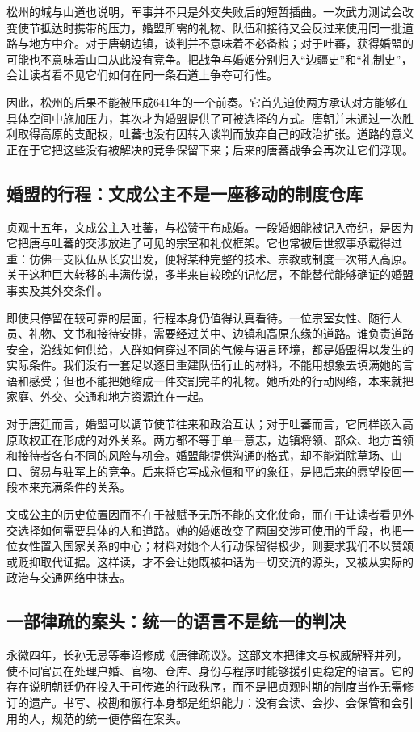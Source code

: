 松州的城与山道也说明，军事并不只是外交失败后的短暂插曲。一次武力测试会改变使节抵达时携带的压力，婚盟所需的礼物、队伍和接待又会反过来使用同一批道路与地方中介。对于唐朝边镇，谈判并不意味着不必备粮；对于吐蕃，获得婚盟的可能也不意味着山口从此没有竞争。把战争与婚姻分别归入“边疆史”和“礼制史”，会让读者看不见它们如何在同一条石道上争夺可行性。

因此，松州的后果不能被压成641年的一个前奏。它首先迫使两方承认对方能够在具体空间中施加压力，其次才为婚盟提供了可被选择的方式。唐朝并未通过一次胜利取得高原的支配权，吐蕃也没有因转入谈判而放弃自己的政治扩张。道路的意义正在于它把这些没有被解决的竞争保留下来；后来的唐蕃战争会再次让它们浮现。

\subsection{婚盟的行程：文成公主不是一座移动的制度仓库}
贞观十五年，文成公主入吐蕃，与松赞干布成婚。一段婚姻能被记入帝纪，是因为它把唐与吐蕃的交涉放进了可见的宗室和礼仪框架。它也常被后世叙事承载得过重：仿佛一支队伍从长安出发，便将某种完整的技术、宗教或制度一次带入高原。关于这种巨大转移的丰满传说，多半来自较晚的记忆层，不能替代能够确证的婚盟事实及其外交条件。

即使只停留在较可靠的层面，行程本身仍值得认真看待。一位宗室女性、随行人员、礼物、文书和接待安排，需要经过关中、边镇和高原东缘的道路。谁负责道路安全，沿线如何供给，人群如何穿过不同的气候与语言环境，都是婚盟得以发生的实际条件。我们没有一套足以逐日重建队伍行止的材料，不能用想象去填满她的言语和感受；但也不能把她缩成一件交割完毕的礼物。她所处的行动网络，本来就把家庭、外交、交通和地方资源连在一起。

对于唐廷而言，婚盟可以调节使节往来和政治互认；对于吐蕃而言，它同样嵌入高原政权正在形成的对外关系。两方都不等于单一意志，边镇将领、部众、地方首领和接待者各有不同的风险与机会。婚盟能提供沟通的格式，却不能消除草场、山口、贸易与驻军上的竞争。后来将它写成永恒和平的象征，是把后来的愿望投回一段本来充满条件的关系。

文成公主的历史位置因而不在于被赋予无所不能的文化使命，而在于让读者看见外交选择如何需要具体的人和道路。她的婚姻改变了两国交涉可使用的手段，也把一位女性置入国家关系的中心；材料对她个人行动保留得极少，则要求我们不以赞颂或贬抑取代证据。这样读，才不会让她既被神话为一切交流的源头，又被从实际的政治与交通网络中抹去。

\subsection{一部律疏的案头：统一的语言不是统一的判决}
永徽四年，长孙无忌等奉诏修成《唐律疏议》。这部文本把律文与权威解释并列，使不同官员在处理户婚、官物、仓库、身份与程序时能够援引更稳定的语言。它的存在说明朝廷仍在投入于可传递的行政秩序，而不是把贞观时期的制度当作无需修订的遗产。书写、校勘和颁行本身都是组织能力：没有会读、会抄、会保管和会引用的人，规范的统一便停留在案头。

